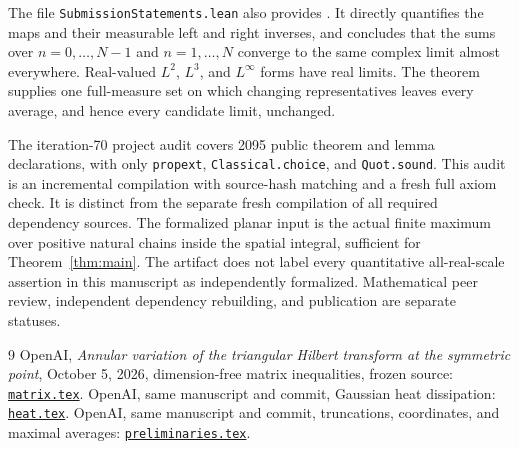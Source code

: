 \documentclass[11pt,a4paper]{article}
\theoremstyle{definition}
\newcommand{\1}{\mathbf1}
\begin{document}
The file \texttt{SubmissionStatements.lean} also provides
.
It directly quantifies the maps and their measurable left and right
inverses, and concludes that the sums over $n=0,\ldots,N-1$ and
$n=1,\ldots,N$ converge to the same complex limit almost everywhere.
Real-valued $L^2$, $L^3$, and $L^\infty$ forms have real limits.
The theorem 
supplies one full-measure set on which changing representatives leaves
every average, and hence every candidate limit, unchanged.

The iteration-70 project audit covers 2095 public theorem and lemma
declarations, with only \texttt{propext}, \texttt{Classical.choice},
and \texttt{Quot.sound}. This audit is an incremental compilation with
source-hash matching and a fresh full axiom check. It is distinct from
the separate fresh compilation of all required dependency sources.
The formalized planar input is the actual finite maximum over positive
natural chains inside the spatial integral, sufficient for
Theorem~\ref{thm:main}. The artifact does not label every quantitative
all-real-scale assertion in this manuscript as independently formalized.
Mathematical peer review, independent dependency rebuilding, and
publication are separate statuses.

\begin{thebibliography}{9}
OpenAI, \emph{Annular variation of the triangular Hilbert transform at
the symmetric point}, October 5, 2026, dimension-free matrix
inequalities, frozen source:
\href{https://github.com/openai/math/blob/adc7f1241b42e322a6451854ab7e4b4c146bf78a/preprints/Annular-variation-of-the-triangular-Hilbert-transform-at-the-symmetric-point-October-5-2026/build/sections/matrix.tex}{\texttt{matrix.tex}}.
OpenAI, same manuscript and commit, Gaussian heat dissipation:
\href{https://github.com/openai/math/blob/adc7f1241b42e322a6451854ab7e4b4c146bf78a/preprints/Annular-variation-of-the-triangular-Hilbert-transform-at-the-symmetric-point-October-5-2026/build/sections/heat.tex}{\texttt{heat.tex}}.
OpenAI, same manuscript and commit, truncations, coordinates, and
maximal averages:
\href{https://github.com/openai/math/blob/adc7f1241b42e322a6451854ab7e4b4c146bf78a/preprints/Annular-variation-of-the-triangular-Hilbert-transform-at-the-symmetric-point-October-5-2026/build/sections/preliminaries.tex}{\texttt{preliminaries.tex}}.
\end{thebibliography}
\end{document}
